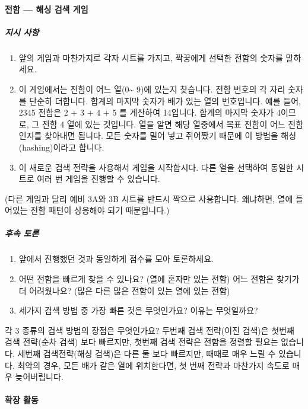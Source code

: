 \documentclass[]{article}
\begin{document}
\mbox{}\paragraph{전함 --- 해싱 검색 게임}\label{mdash----2}

\subparagraph{지시 사항}\label{section-98}

\begin{enumerate}
\item
  앞의 게임과 마찬가지로 각자 시트를 가지고, 짝꿍에게 선택한 전함의
  숫자를 말하세요.
\item
  이 게임에서는 전함이 어느 열(0\textasciitilde{} 9)에 있는지 찾습니다.
  전함 번호의 각 자리 숫자를 단순히 더합니다. 합계의 마지막 숫자가 배가
  있는 열의 번호입니다. 예를 들어, 2345 전함은 2 + 3 + 4 + 5 를 계산하여
  14입니다. 합계의 마지막 숫자가 4이므로, 그 전함 4 열에 있는 것입니다.
  열을 알면 해당 열중에서 목표 전함이 어느 전함인지를 찾아내면 됩니다.
  모든 숫자를 밀어 넣고 쥐어짰기 때문에 이 방법을 해싱(hashing)이라고
  합니다.
\item
  이 새로운 검색 전략을 사용해서 게임을 시작합시다. 다른 열을 선택하여
  동일한 시트로 여러 번 게임을 진행할 수 있습니다.
\end{enumerate}

(다른 게임과 달리 예비 3A와 3B 시트를 반드시 짝으로 사용합니다.
왜냐하면, 열에 들어있는 전함 패턴이 상응해야 되기 때문입니다.)

\subparagraph{후속 토론}\label{section-99}

\begin{enumerate}
\item
  앞에서 진행했던 것과 동일하게 점수를 모아 토론하세요.
\item
  어떤 전함을 빠르게 찾을 수 있나요? (열에 혼자만 있는 전함) 어느 전함은
  찾기가 더 어려웠나요? (많은 다른 많은 전함이 있는 열에 있는 전함)
\item
  세가지 검색 방법 중 가장 빠른 것은 무엇인가요? 이유는 무엇일까요?
\end{enumerate}

각 3 종류의 검색 방법의 장점은 무엇인가요? 두번째 검색 전략(이진 검색)은
첫번째 검색 전략(순차 검색) 보다 빠르지만, 첫번째 검색 전략은 전함을
정렬할 필요는 없습니다. 세번째 검색전략(해싱 검색)은 다른 둘 보다
빠르지만, 때때로 매우 느릴 수 있습니다. 최악의 경우, 모든 배가 같은 열에
위치한다면, 첫 번째 전략과 마찬가지 속도로 매우 늦어버립니다.

\mbox{}\paragraph{확장 활동}\label{section-100}
\end{document}
